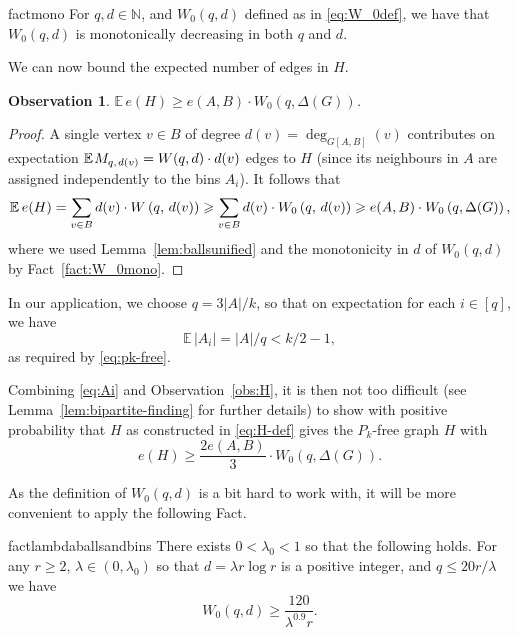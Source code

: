 \documentclass[12pt,reqno]{amsart}
\newtheorem{obs}[theorem]{Observation}
\theoremstyle{remark}
\numberwithin{theorem}{section}
\renewcommand{\(}{\bigl(}
\renewcommand{\)}{\bigr)\vphantom{)}}
\renewcommand{\leq}{\le}
\renewcommand{\geq}{\ge}
\renewcommand{\le}{\leqslant}
\renewcommand{\ge}{\geqslant}
\newcommand{\NN}{\mathbb{N}}
\begin{document}
\begin{restatable}{fact}{mono}\label{fact:W_0mono}
    For $q,d\in \NN$, and $W_0(q,d)$ defined as in \eqref{eq:W_0def}, we have that $W_0(q,d)$ is monotonically decreasing in both $q$ and $d$. 
\end{restatable}
We can now bound the expected number of edges in $H$. 
\begin{obs}\label{obs:H}
    $\mathbb{E} \, e(H) \geq  e(A,B) \cdot W_0\left( q, \Delta(G)\right)$.
\end{obs}
\begin{proof}
    A single vertex $v \in B$ of degree $d(v) = \deg_{G[A,B]}(v)$ contributes on expectation $\mathbb{E}\hspace{0.1em} M_{q, \hspace{0.1em}d(v)}=W(q,d)\cdot d(v)$ edges to $H$ (since its neighbours in $A$ are assigned independently to the bins $A_i$). It follows that
\[ \mathbb{E} \hspace{0.2em}e(H) = \sum_{v\in B} d(v)\cdot W\left(q,\, d(v) \right)\geq\sum_{v\in B} d(v)\cdot W_0\left(q,\, d(v) \right)\geq e(A,B) \cdot W_0\left( q, \Delta(G)\right),\]
where we used Lemma~\ref{lem:ballsunified} and the monotonicity in $d$ of $W_0(q,d)$ by Fact~\ref{fact:W_0mono}. 
\end{proof}

In our application, we choose $q = 3|A|/k$, so that on expectation for each $i \in [q]$, we have 
\begin{equation}\label{eq:Ai}
  \mathbb{E}\,|A_i| = |A|/q < k/2 - 1,  
\end{equation}
as required by \eqref{eq:pk-free}.

Combining \eqref{eq:Ai} and Observation~\eqref{obs:H}, it is then not too difficult (see Lemma~\ref{lem:bipartite-finding} for further details) to show with positive probability that $H$ as constructed in \eqref{eq:H-def} gives the $P_k$-free graph $H$ with 
\begin{equation}\label{eq:withconcentration}
    e(H) \geq \frac{2e(A,B)}{3} \cdot W_0(q, \Delta(G)).
\end{equation}

As the definition of $W_0(q,d)$ is a bit hard to work with, it will be more convenient to apply the following Fact.

\begin{restatable}{fact}{lambdaballsandbins}\label{fact:lambdaballsunified}
    There exists $0<\lambda_0<1$ so that the following holds. For any $r\geq 2$, $\lambda\in (0,\lambda_0)$ so that $d=\lambda r\log r$ is a positive integer, and  $q\leq 20r/\lambda$ we have
    \[W_0(q,d)\geq \frac{120}{\lambda^{0.9}r}.\]
\end{restatable}
\end{document}
